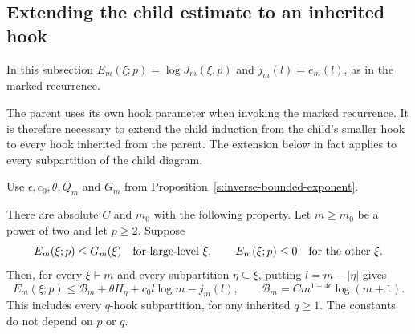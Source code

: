 \subsection{Extending the child estimate to an inherited hook}
In this subsection $E_m(\xi;p)=\log J_m(\xi,p)$ and
$j_m(l)=e_m(l)$, as in the marked recurrence.
\label{s:child-hook-extension-section}

The parent uses its own hook parameter when invoking the marked recurrence.
It is therefore necessary to extend the child induction from the child's
smaller hook to every hook inherited from the parent.  The extension below
in fact applies to every subpartition of the child diagram.

Use $\epsilon,c_0,\theta,Q_m$ and $G_m$ from
Proposition~\ref{s:inverse-bounded-exponent}.

\begin{lemma}
\label{s:arbitrary-hook-child-allowance}
There are absolute $C$ and $m_0$ with the following property.  Let
$m\ge m_0$ be a power of two and let $p\ge2$.  Suppose
\[
 E_m(\xi;p)\le G_m(\xi)\quad\hbox{for large-level $\xi$},
 \qquad
 E_m(\xi;p)\le0\quad\hbox{for the other $\xi$}.
\]
Then, for every $\xi\vdash m$ and every subpartition
$\eta\subseteq\xi$, putting $l=m-|\eta|$ gives
\begin{equation}
 E_m(\xi;p)
 \le \mathcal B_m+\theta H_\eta+c_0l\log m-j_m(l),
 \qquad \mathcal B_m=Cm^{1-4\epsilon}\log(m+1).
 \label{s:eq:arbitrary-hook-child-allowance}
\end{equation}
This includes every $q$-hook subpartition, for any inherited $q\ge1$.
The constants do not depend on $p$ or $q$.
\end{lemma}

